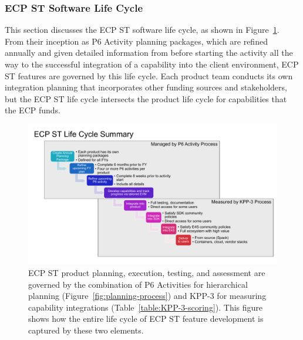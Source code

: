 \subsubsection{ECP ST Software Life Cycle}
This section discusses the ECP ST software life cycle, as shown in Figure~\ref{fig:lifecycle}.  From their inception as P6 Activity planning packages, which are refined annually and given detailed information from before starting the activity all the way to the successful integration of a capability into the client environment, ECP ST features are governed by this life cycle.  Each product team conducts its own integration planning that incorporates other funding sources and stakeholders, but the ECP ST life cycle intersects the product life cycle for capabilities that the ECP funds.

\begin{figure}
	\centering
	\includegraphics[width=1.0\linewidth]{E4S-Lifecycle}
	\caption{ECP ST product planning, execution, testing, and assessment are governed by the combination of P6 Activities for hierarchical planning (Figure~\ref{fig:planning-process}) and KPP-3 for measuring capability integrations (Table~\ref{table:KPP-3-scoring}).  This figure shows how the entire life cycle of ECP ST feature development is captured by these two elements.}
	\label{fig:lifecycle}
\end{figure}

